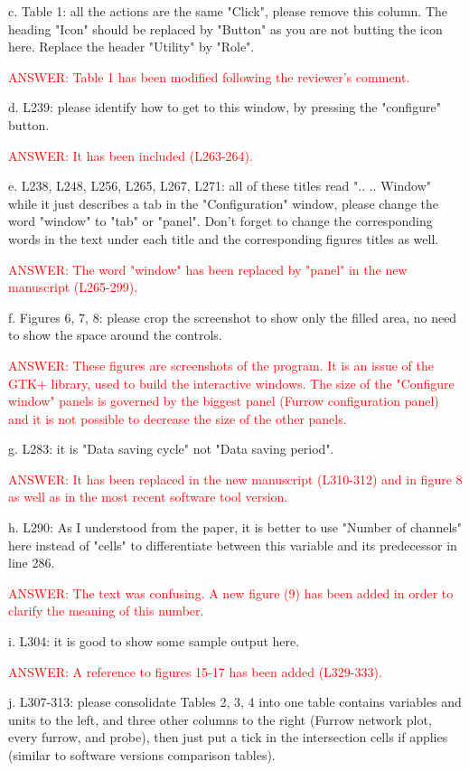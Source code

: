 \documentclass[a4paper]{article}
\begin{document}
c. Table 1: all the actions are the same "Click", please remove this column. The heading "Icon" should be replaced by "Button" as you are not butting the icon here. Replace the header "Utility" by "Role".

\textcolor{red}{ANSWER: Table 1 has been modified following the
reviewer's comment.}

d. L239: please identify how to get to this window, by pressing the "configure" button.

\textcolor{red}{ANSWER: It has been included (L263-264).}

e. L238, L248, L256, L265, L267, L271: all of these titles read ".. .. Window" while it just describes a tab in the "Configuration" window, please change the word "window" to "tab" or "panel". Don't forget to change the corresponding words in the text under each title and the corresponding figures titles as well.

\textcolor{red}{ANSWER: The word "window" has been replaced by "panel" in
the new manuscript (L265-299).}

f. Figures 6, 7, 8: please crop the screenshot to show only the filled area, no need to show the space around the controls.

\textcolor{red}{ANSWER: These figures are screenshots of the program. It is an
issue of the GTK+ library, used to build the interactive windows. The size of
the "Configure window" panels is governed by the biggest panel (Furrow
configuration panel) and it is not possible to decrease the size of the other
panels.}

g. L283: it is "Data saving cycle" not "Data saving period".

\textcolor{red}{ANSWER: It has been replaced in the new manuscript
(L310-312) and in figure 8 as well as in the most recent software tool version.}

h. L290: As I understood from the paper, it is better to use "Number of channels" here instead of "cells" to differentiate between this variable and its predecessor in line 286.

\textcolor{red}{ANSWER: The text was confusing. A new figure (9) has been
added in order to clarify the meaning of this number.}

i. L304: it is good to show some sample output here.

\textcolor{red}{ANSWER: A reference to figures 15-17 has been added
(L329-333).}

j. L307-313: please consolidate Tables 2, 3, 4 into one table contains variables and units to the left, and three other columns to the right (Furrow network plot, every furrow, and probe), then just put a tick in the intersection cells if applies (similar to software versions comparison tables).
\end{document}
